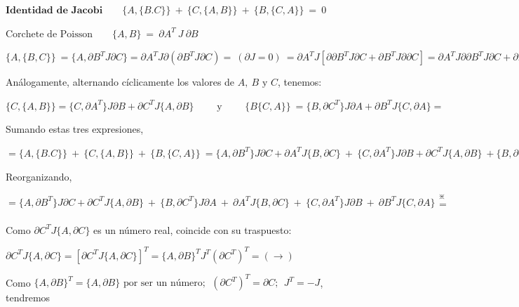 \vspace{5pt}

\color{NavyBlue}


$\textbf{Identidad de Jacobi} \qquad \{A,\{B.C\}\} \ + \ \{C,\{A,B\}\} \ + \  \{B,\{C,A\}\} \ = \ 0$

$\text{Corchete de Poisson} \qquad \{A,B\} \ = \ \partial A^T \ J \ \partial B$
 
\vspace{5mm}

$\{A,\{B,C\}\}\ = \{A,\partial B^T J \partial C\}= \partial A^T J \partial ( \partial B^T J \partial C) = \ (\partial J = 0) \ =
\partial A^T J [ \partial \partial B^T J \partial C + \partial B^T J \partial \partial C ] = \partial A^T J \partial \partial B^T J \partial C + \partial A^T J  \partial B^T J \partial \partial C =
\{A,\partial B^T\} J \partial C + \partial A^T J \{B, \partial C\}$

Análogamente, alternando cíclicamente los valores de $A,\ B \text{ y } C$, tenemos:

$\{C,\{A,B\}\}=\{C,\partial A^T\}J \partial B + \partial C^T J \{A, \partial B\} \qquad \text{ y } \qquad \{B\{C,A\}\}\ = \{B,\partial C^T\}J \partial A + \partial B^T J\{C,\partial A\}=$

Sumando estas tres expresiones,

$= \{A,\{B.C\}\} \ + \ \{C,\{A,B\}\} \ + \  \{B,\{C,A\}\} \ = 
\{A,\partial B^T\} J \partial C + \partial A^T J \{B, \partial C\} \ + \    \{C,\partial A^T\}J \partial B + \partial C^T J \{A, \partial B\} \ + \{B,\partial C^T\}J \partial A + \partial B^T J \{C,\partial A\} = $

Reorganizando,

$=\{A, \partial B^T\}J \partial C + \partial  C^T J \{A,\partial  B\} \ + \ 
\{B, \partial  C^T\}J \partial A \ + \ \partial  A^T J \{B, \partial  C\} \ + \ 
\{C, \partial  A^T\} J \partial  B \ + \ \partial B^T J \{C, \partial  A\}
\begin{matrix} _\divideontimes \\ =  \\ \, \end{matrix}$

Como $\partial C^T J \{A, \partial  C\}$ es un número real, coincide con su traspuesto:


$\partial C^T J \{A, \partial  C\}=[\partial C^T J \{A, \partial  C\}]^T=
\{A, \partial B\}^T J^T (\partial C^T)^T = (\to) $

Como $ \{A, \partial B\}^T=\{A, \partial B\}  \text{ por ser un número} ; \ \  (\partial C^T)^T=\partial C;\ \ J^T=-J $, tendremos


